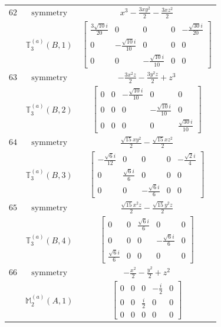 \documentclass[fleqn,8pt,landscape]{jsarticle}
\begin{document}
\begin{longtable}{ccc}
$ 62 $ & $ \text{symmetry} $ & $ x^{3} - \frac{3 x y^{2}}{2} - \frac{3 x z^{2}}{2} $ \\
$  $ & $ \mathbb{T}_{3}^{(a)}(B,1) $ & $ \begin{bmatrix} \frac{3 \sqrt{10} i}{20} & 0 & 0 & 0 & - \frac{\sqrt{30} i}{20} \\ 0 & - \frac{\sqrt{10} i}{10} & 0 & 0 & 0 \\ 0 & 0 & - \frac{\sqrt{10} i}{10} & 0 & 0 \end{bmatrix} $ \\ \hline
$ 63 $ & $ \text{symmetry} $ & $ - \frac{3 x^{2} z}{2} - \frac{3 y^{2} z}{2} + z^{3} $ \\
$  $ & $ \mathbb{T}_{3}^{(a)}(B,2) $ & $ \begin{bmatrix} 0 & 0 & - \frac{\sqrt{10} i}{10} & 0 & 0 \\ 0 & 0 & 0 & - \frac{\sqrt{10} i}{10} & 0 \\ 0 & 0 & 0 & 0 & \frac{\sqrt{30} i}{10} \end{bmatrix} $ \\ \hline
$ 64 $ & $ \text{symmetry} $ & $ \frac{\sqrt{15} x y^{2}}{2} - \frac{\sqrt{15} x z^{2}}{2} $ \\
$  $ & $ \mathbb{T}_{3}^{(a)}(B,3) $ & $ \begin{bmatrix} - \frac{\sqrt{6} i}{12} & 0 & 0 & 0 & - \frac{\sqrt{2} i}{4} \\ 0 & \frac{\sqrt{6} i}{6} & 0 & 0 & 0 \\ 0 & 0 & - \frac{\sqrt{6} i}{6} & 0 & 0 \end{bmatrix} $ \\ \hline
$ 65 $ & $ \text{symmetry} $ & $ \frac{\sqrt{15} x^{2} z}{2} - \frac{\sqrt{15} y^{2} z}{2} $ \\
$  $ & $ \mathbb{T}_{3}^{(a)}(B,4) $ & $ \begin{bmatrix} 0 & 0 & \frac{\sqrt{6} i}{6} & 0 & 0 \\ 0 & 0 & 0 & - \frac{\sqrt{6} i}{6} & 0 \\ \frac{\sqrt{6} i}{6} & 0 & 0 & 0 & 0 \end{bmatrix} $ \\ \hline
$ 66 $ & $ \text{symmetry} $ & $ - \frac{x^{2}}{2} - \frac{y^{2}}{2} + z^{2} $ \\
$  $ & $ \mathbb{M}_{2}^{(a)}(A,1) $ & $ \begin{bmatrix} 0 & 0 & 0 & - \frac{i}{2} & 0 \\ 0 & 0 & \frac{i}{2} & 0 & 0 \\ 0 & 0 & 0 & 0 & 0 \end{bmatrix} $ \\ \hline

\end{longtable}
\end{document}
